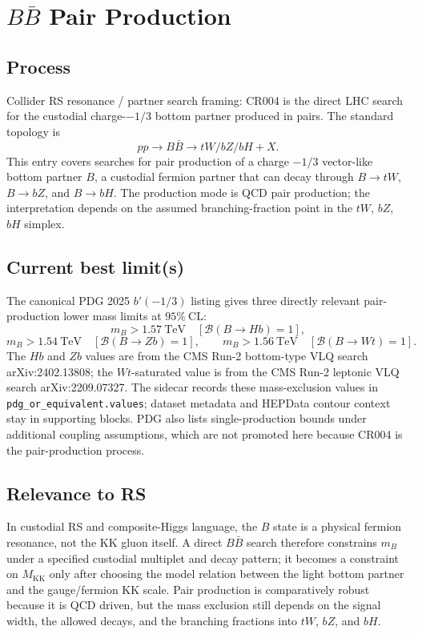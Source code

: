 
\section{\texorpdfstring{\(B\bar B\) Pair Production}{B Bbar Pair Production}}

\subsection*{Process}
Collider RS resonance / partner search framing: CR004 is the direct LHC
search for the custodial charge-\(-1/3\) bottom partner produced in pairs.
The standard topology is
\[
  pp \to B\bar B \to tW/bZ/bH + X .
\]
This entry covers searches for pair production of a charge \(-1/3\)
vector-like bottom partner \(B\), a custodial fermion partner that can decay
through \(B\to tW\), \(B\to bZ\), and \(B\to bH\).  The production mode is
QCD pair production; the interpretation depends on the assumed
branching-fraction point in the \(tW\), \(bZ\), \(bH\) simplex.

\subsection*{Current best limit(s)}
The canonical PDG 2025 \(b'(-1/3)\) listing gives three directly relevant
pair-production lower mass limits at \(95\%~\mathrm{CL}\):
\[
  m_B > 1.57~\mathrm{TeV}\quad [\mathcal{B}(B\to Hb)=1],
\]
\[
  m_B > 1.54~\mathrm{TeV}\quad [\mathcal{B}(B\to Zb)=1],
  \qquad
  m_B > 1.56~\mathrm{TeV}\quad [\mathcal{B}(B\to Wt)=1].
\]
The \(Hb\) and \(Zb\) values are from the CMS Run-2 bottom-type VLQ search
arXiv:2402.13808; the \(Wt\)-saturated value is from the CMS Run-2 leptonic
VLQ search arXiv:2209.07327.  The sidecar records these mass-exclusion
values in \texttt{pdg\_or\_equivalent.values}; dataset metadata and HEPData
contour context stay in supporting blocks.  PDG also lists single-production
bounds under additional coupling assumptions, which are not promoted here
because CR004 is the pair-production process.

\subsection*{Relevance to RS}
In custodial RS and composite-Higgs language, the \(B\) state is a physical
fermion resonance, not the KK gluon itself.  A direct \(B\bar B\) search
therefore constrains \(m_B\) under a specified custodial multiplet and decay
pattern; it becomes a constraint on \(M_{\mathrm{KK}}\) only after choosing
the model relation between the light bottom partner and the gauge/fermion
KK scale.  Pair production is comparatively robust because it is QCD driven,
but the mass exclusion still depends on the signal width, the allowed
decays, and the branching fractions into \(tW\), \(bZ\), and \(bH\).

